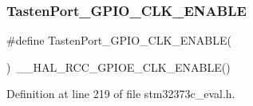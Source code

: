 \subsubsection{Tasten\+Port\+\_\+\+G\+P\+I\+O\+\_\+\+C\+L\+K\+\_\+\+E\+N\+A\+B\+LE}
{\footnotesize\ttfamily \#define Tasten\+Port\+\_\+\+G\+P\+I\+O\+\_\+\+C\+L\+K\+\_\+\+E\+N\+A\+B\+LE(\begin{DoxyParamCaption}{ }\end{DoxyParamCaption})~\+\_\+\+\_\+\+H\+A\+L\+\_\+\+R\+C\+C\+\_\+\+G\+P\+I\+O\+E\+\_\+\+C\+L\+K\+\_\+\+E\+N\+A\+B\+LE()}



Definition at line 219 of file stm32373c\+\_\+eval.\+h.

